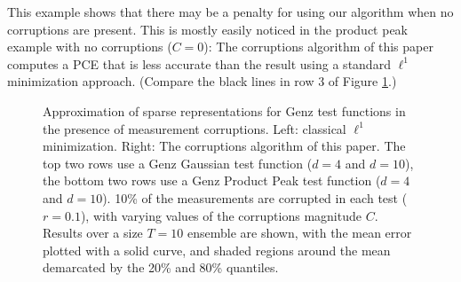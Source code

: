 {This example shows that there may be a penalty for using our algorithm when no corruptions are present. This is mostly easily noticed in the product peak example with no corruptions ($C = 0$): The corruptions algorithm of this paper computes a PCE that is less accurate than the result using a standard $\ell^1$ minimization approach. (Compare the black lines in row 3 of Figure \ref{fig:genz-tests}.)

\begin{figure}
  \begin{center}
\end{center}
\caption{Approximation of sparse representations for Genz test functions in the presence of measurement corruptions. Left: classical $\ell^1$ minimization. Right: The corruptions algorithm of this paper. The top two rows use a Genz Gaussian test function ($d=4$ and $d=10$), the bottom two rows use a Genz Product Peak test function ($d=4$ and $d=10$). 10\% of the measurements are corrupted in each test ($r = 0.1$), with varying values of the corruptions magnitude $C$. Results over a size $T=10$ ensemble are shown, with the mean error plotted with a solid curve, and shaded regions around the mean demarcated by the 20\% and 80\% quantiles.}
\label{fig:genz-tests}
\end{figure}
}

